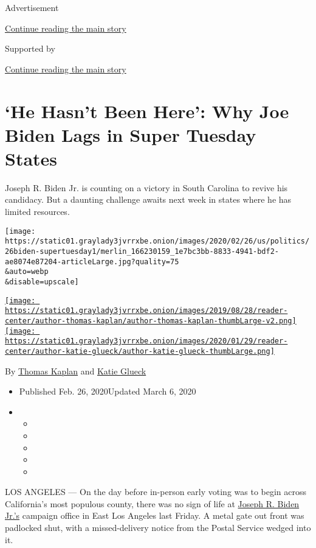 Advertisement

\protect\hyperlink{after-top}{Continue reading the main story}

Supported by

\protect\hyperlink{after-sponsor}{Continue reading the main story}

\hypertarget{he-hasnt-been-here-why-joe-biden-lags-in-super-tuesday-states}{%
\section{`He Hasn't Been Here': Why Joe Biden Lags in Super Tuesday
States}\label{he-hasnt-been-here-why-joe-biden-lags-in-super-tuesday-states}}

Joseph R. Biden Jr. is counting on a victory in South Carolina to revive
his candidacy. But a daunting challenge awaits next week in states where
he has limited resources.

\texttt{[image: https://static01.graylady3jvrrxbe.onion/images/2020/02/26/us/politics/26biden-supertuesday1/merlin\_166230159\_1e7bc3bb-8833-4941-bdf2-ae8074e87204-articleLarge.jpg?quality=75\\\&auto=webp\\\&disable=upscale]}

\href{https://www.nytimes3xbfgragh.onion/by/thomas-kaplan}{\texttt{[image: https://static01.graylady3jvrrxbe.onion/images/2019/08/28/reader-center/author-thomas-kaplan/author-thomas-kaplan-thumbLarge-v2.png]}}\href{https://www.nytimes3xbfgragh.onion/by/katie-glueck}{\texttt{[image: https://static01.graylady3jvrrxbe.onion/images/2020/01/29/reader-center/author-katie-glueck/author-katie-glueck-thumbLarge.png]}}

By \href{https://www.nytimes3xbfgragh.onion/by/thomas-kaplan}{Thomas
Kaplan} and
\href{https://www.nytimes3xbfgragh.onion/by/katie-glueck}{Katie Glueck}

\begin{itemize}
\item
  Published Feb. 26, 2020Updated March 6, 2020
\item
  \begin{itemize}
  \item
  \item
  \item
  \item
  \item
  \end{itemize}
\end{itemize}

LOS ANGELES --- On the day before in-person early voting was to begin
across California's most populous county, there was no sign of life at
\href{https://www.nytimes3xbfgragh.onion/interactive/2020/us/elections/joe-biden.html}{Joseph
R. Biden Jr.'s} campaign office in East Los Angeles last Friday. A metal
gate out front was padlocked shut, with a missed-delivery notice from
the Postal Service wedged into it.

